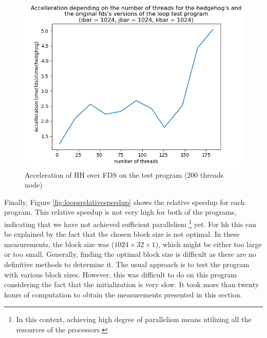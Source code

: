 \begin{figure}[ht!]
  \begin{center}
    \includegraphics[scale=0.6]{img/fds-loops/speedup.png}
    \caption{Acceleration of HH over FDS on the test program (200 threads node)}
    \label{fig:loopsspeedup}
  \end{center}
\end{figure}

Finally, Figure \ref{fig:loopsrelativespeedup} shows the relative speedup for
each program. This relative speedup is not very high for both of the programs,
indicating that we have not achieved sufficient parallelism \footnote{In this
context, achieving high degree of parallelism means utilizing all the resources
of the processors.} yet. For \gls{hh} this can be explained by the fact that the
chosen block size is not optimal. In these measurements, the block size was
($1024\times32\times1$), which might be either too large or too small.
Generally, finding the optimal block size is difficult as there are no
definitive methods to determine it. The usual approach is to test the program
with various block sizes. However, this was difficult to do on this program
considering the fact that the initialization is very slow. It took more than
twenty hours of computation to obtain the measurements presented in this
section.

